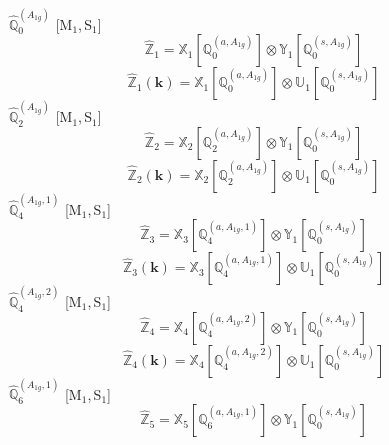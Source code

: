 \documentclass[fleqn,10pt,landscape]{article}
\begin{document}
\begin{itemize}
\vspace{4mm}
\noindent {} $\,\,\,\hat{\mathbb{Q}}_{0}^{(A_{1g})}$ [M$_{1}$,\,S$_{1}$]
\begin{dmath*}
\hat{\mathbb{Z}}_{1}=\mathbb{X}_{1}[\mathbb{Q}_{0}^{(a,A_{1g})}] \otimes\mathbb{Y}_{1}[\mathbb{Q}_{0}^{(s,A_{1g})}]
\end{dmath*}
\begin{dmath*}
\hat{\mathbb{Z}}_{1}(\bm{k})=\mathbb{X}_{1}[\mathbb{Q}_{0}^{(a,A_{1g})}] \otimes\mathbb{U}_{1}[\mathbb{Q}_{0}^{(s,A_{1g})}]
\end{dmath*}
\vspace{4mm}
\noindent {} $\,\,\,\hat{\mathbb{Q}}_{2}^{(A_{1g})}$ [M$_{1}$,\,S$_{1}$]
\begin{dmath*}
\hat{\mathbb{Z}}_{2}=\mathbb{X}_{2}[\mathbb{Q}_{2}^{(a,A_{1g})}] \otimes\mathbb{Y}_{1}[\mathbb{Q}_{0}^{(s,A_{1g})}]
\end{dmath*}
\begin{dmath*}
\hat{\mathbb{Z}}_{2}(\bm{k})=\mathbb{X}_{2}[\mathbb{Q}_{2}^{(a,A_{1g})}] \otimes\mathbb{U}_{1}[\mathbb{Q}_{0}^{(s,A_{1g})}]
\end{dmath*}
\vspace{4mm}
\noindent {} $\,\,\,\hat{\mathbb{Q}}_{4}^{(A_{1g},1)}$ [M$_{1}$,\,S$_{1}$]
\begin{dmath*}
\hat{\mathbb{Z}}_{3}=\mathbb{X}_{3}[\mathbb{Q}_{4}^{(a,A_{1g},1)}] \otimes\mathbb{Y}_{1}[\mathbb{Q}_{0}^{(s,A_{1g})}]
\end{dmath*}
\begin{dmath*}
\hat{\mathbb{Z}}_{3}(\bm{k})=\mathbb{X}_{3}[\mathbb{Q}_{4}^{(a,A_{1g},1)}] \otimes\mathbb{U}_{1}[\mathbb{Q}_{0}^{(s,A_{1g})}]
\end{dmath*}
\vspace{4mm}
\noindent {} $\,\,\,\hat{\mathbb{Q}}_{4}^{(A_{1g},2)}$ [M$_{1}$,\,S$_{1}$]
\begin{dmath*}
\hat{\mathbb{Z}}_{4}=\mathbb{X}_{4}[\mathbb{Q}_{4}^{(a,A_{1g},2)}] \otimes\mathbb{Y}_{1}[\mathbb{Q}_{0}^{(s,A_{1g})}]
\end{dmath*}
\begin{dmath*}
\hat{\mathbb{Z}}_{4}(\bm{k})=\mathbb{X}_{4}[\mathbb{Q}_{4}^{(a,A_{1g},2)}] \otimes\mathbb{U}_{1}[\mathbb{Q}_{0}^{(s,A_{1g})}]
\end{dmath*}
\vspace{4mm}
\noindent {} $\,\,\,\hat{\mathbb{Q}}_{6}^{(A_{1g},1)}$ [M$_{1}$,\,S$_{1}$]
\begin{dmath*}
\hat{\mathbb{Z}}_{5}=\mathbb{X}_{5}[\mathbb{Q}_{6}^{(a,A_{1g},1)}] \otimes\mathbb{Y}_{1}[\mathbb{Q}_{0}^{(s,A_{1g})}]

\end{dmath*}
\end{itemize}
\end{document}
